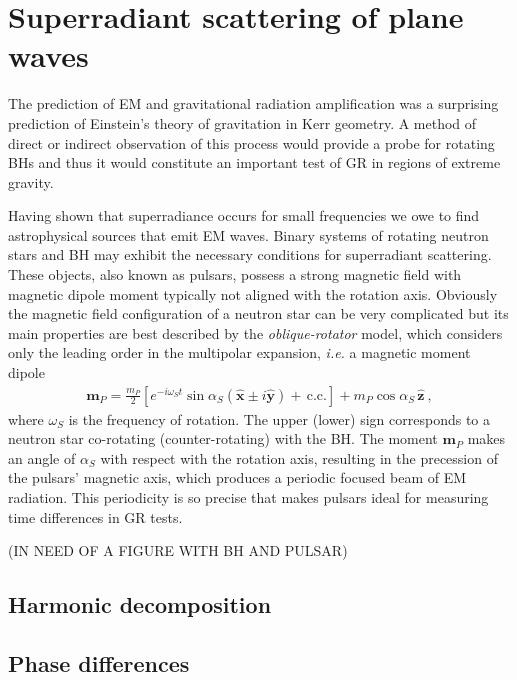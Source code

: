 
\chapter{Superradiant scattering of plane waves} %
\label{Chapter5}


The prediction of EM and gravitational radiation amplification was a surprising prediction of Einstein's theory of gravitation in Kerr geometry.
A method of direct or indirect observation of this process would provide a probe for rotating BHs and thus it would constitute an important test of GR in regions of extreme gravity.

Having shown that superradiance occurs for small frequencies we owe to find astrophysical sources that emit EM waves.
Binary systems of rotating neutron stars and BH may exhibit the necessary conditions for superradiant scattering.
These objects, also known as pulsars, possess a strong magnetic field with magnetic dipole moment typically not aligned with the rotation axis.
Obviously the magnetic field configuration of a neutron star can be very complicated but its main properties are best described by the \emph{oblique-rotator} model, which considers only the leading order in the multipolar expansion, \emph{i.e.} a magnetic moment dipole
\begin{align}
    \mathbf{m}_P = \frac{m_P}{2} \left[ e^{-i \omega_S t} \sin\alpha_S ( \mathbf{\hat{x}} \pm i \mathbf{\hat{y}}) + \,\text{c.c.} \right] + m_P \cos\alpha_S \,\mathbf{\hat{z}} ~,
\end{align}
where $\omega_S$ is the frequency of rotation.
The upper (lower) sign corresponds to a neutron star co-rotating (counter-rotating) with the BH.
The moment $\mathbf{m}_P$ makes an angle of $\alpha_S$ with respect with the rotation axis, resulting in the precession of the pulsars' magnetic axis, which produces a periodic focused beam of EM radiation.
This periodicity is so precise that makes pulsars ideal for measuring time differences in GR tests.

(IN NEED OF A FIGURE WITH BH AND PULSAR)







\section{Harmonic decomposition}

\section{Phase differences}



\cleardoublepage